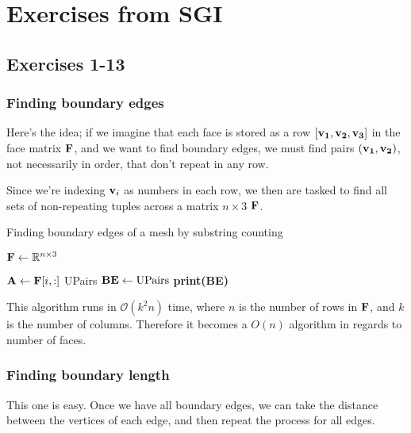 \chapter{Exercises from SGI}

\section{Exercises 1-13}
\subsection{Finding boundary edges}

Here's the idea; if we imagine that each face is stored
as a row $[\bf{v_1, v_2, v_3}]$ in the face matrix
$\bf{F}$, and we want to find boundary edges, we must
find pairs $\bf{(v_1, v_2)}$, not necessarily in order,
that don't repeat in any row.

\spa

Since we're indexing $\bf{v}_i$ as numbers in each row,
we then are tasked to find all sets of non-repeating tuples
across a matrix $n \times 3$ $\bf{F}$.

\begin{algorithm}
\caption{Finding boundary edges of a mesh by substring counting}
\begin{algorithmic}[1]

\State $\bf{F} \gets \RR^{n \times 3}$
    
    \State $\bf{A} \gets \bf{F}[i,:]$
    \EndFor
    \EndFor
    \EndFor
\State \Return UPairs
\State $\bf{BE} \gets \text{UPairs}$
\State \textbf{print(BE)}
\EndProcedure
\end{algorithmic}
\end{algorithm}

This algorithm runs in $\mathcal{O}(k^2n)$ time, where
$n$ is the number of rows in $\bf{F}$, and $k$ is the
number of columns. Therefore it becomes a $O(n)$ algorithm
in regards to number of faces.


\subsection{Finding boundary length}

This one is easy. Once we have all boundary edges,
we can take the distance between the vertices of each edge,
and then repeat the process for all edges.


